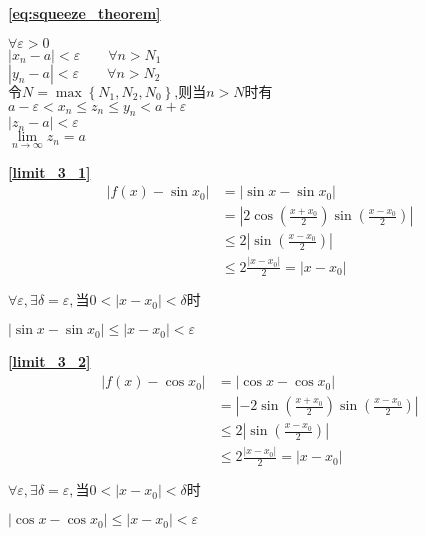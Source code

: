 \textbf{\large \ref{eq:squeeze_theorem}}
\begin{center}
    $\forall \varepsilon > 0$\\
$\left|x_n-a\right|<\varepsilon\qquad\forall n>N_1$\\
$\left|y_n-a\right|<\varepsilon\qquad\forall n>N_2$\\
$\mbox{令}N = \max\left\{{N_1,N_2,N_0}\right\}\mbox{,则当}n > N\mbox{时有}$\\
$a-\varepsilon<x_n\le z_n\le y_n < a+\varepsilon$\\
$\left|z_n-a\right|<\varepsilon$\\
$\lim\limits_{{n}\to{\infty}}z_n = a$
\end{center}

\textbf{\large \ref{limit_3_1}}
\begin{align*}
        \left|f(x)-\sin x_0\right|&=\left|\sin x-\sin x_0\right|\\
                                &=\left|2\cos(\frac{x+x_0}{2})\sin(\frac{x-x_0}{2})\right|\\
                                &\leqslant 2\left|\sin(\frac{x-x_0}{2})\right|\\
                                &\leqslant 2\frac{\left|x-x_0\right|}{2}= \left|x-x_0\right|
\end{align*}
\centerline{ $\forall \varepsilon,\exists \delta =\varepsilon,\mbox{当}0<\left|x-x_0\right|<\delta\mbox{时}$}
\centerline{$\left|\sin x-\sin x_0\right| \leqslant\left|x-x_0\right|<\varepsilon$}

\textbf{\large \ref{limit_3_2}}
\begin{align*}
        \left|f(x)-\cos x_0\right|&=\left|\cos x-\cos x_0\right|\\
                                &=\left|-2\sin(\frac{x+x_0}{2})\sin(\frac{x-x_0}{2})\right|\\
                                &\leqslant 2\left|\sin(\frac{x-x_0}{2})\right|\\
                                &\leqslant 2\frac{\left|x-x_0\right|}{2}= \left|x-x_0\right|
\end{align*}
\centerline{ $\forall \varepsilon,\exists \delta =\varepsilon,\mbox{当}0<\left|x-x_0\right|<\delta\mbox{时}$}
\centerline{$\left|\cos x-\cos x_0\right| \leqslant\left|x-x_0\right|<\varepsilon$}

